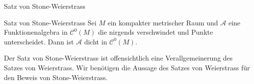 \begin{frame}{Satz von Stone-Weierstrass}
    \begin{satz*}{Satz von Stone-Weierstrass}
        Sei \(M\) ein kompakter metrischer Raum und \( \mathcal{A} \) eine 
        Funktionenalgebra in \( \mathcal{C}^0(M) \) die nirgends verschwindet und 
        Punkte unterscheidet. 
        Dann ist \( \mathcal{A} \) dicht in \( \mathcal{C}^0(M) \).
    \end{satz*}

    \begin{bem}
        Der Satz von Stone-Weierstrass ist offensichtlich eine Verallgemeinerung 
        des Satzes von Weierstrass. 
        Wir benötigen die Aussage des Satzes von Weierstrass für den Beweis von Stone-Weierstrass.
    \end{bem}
\end{frame}